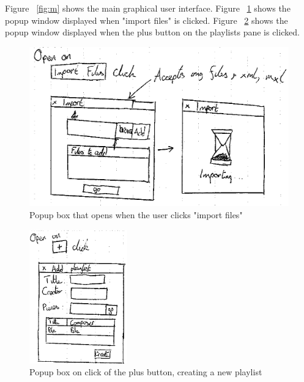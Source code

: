 \begin{appendices}
Figure ~\ref{fig:m} shows the main graphical user interface. Figure ~\ref{fig:import} shows the popup window displayed when "import files" is clicked. Figure ~\ref{fig:plus} shows the popup window displayed when the plus button on the playlists pane is clicked.
\begin{figure}[H]
\includegraphics{designs/import_files}
\caption[width=120pt]{Popup box that opens when the user clicks "import files"}	
\label{fig:import}
\end{figure}
\begin{figure}[H]
\includegraphics[width=120pt]{designs/create_playlist}
\caption{Popup box on click of the plus button, creating a new playlist}	
\label{fig:plus}
\end{figure}


\end{appendices}
